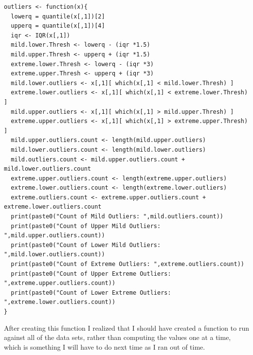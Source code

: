 \documentclass[10pt]{article}
\begin{document}
\begin{verbatim}
outliers <- function(x){
  lowerq = quantile(x[,1])[2]
  upperq = quantile(x[,1])[4]
  iqr <- IQR(x[,1])
  mild.lower.Thresh <- lowerq - (iqr *1.5)
  mild.upper.Thresh <- upperq + (iqr *1.5)
  extreme.lower.Thresh <- lowerq - (iqr *3)
  extreme.upper.Thresh <- upperq + (iqr *3)
  mild.lower.outliers <- x[,1][ which(x[,1] < mild.lower.Thresh) ]
  extreme.lower.outliers <- x[,1][ which(x[,1] < extreme.lower.Thresh) ]
  mild.upper.outliers <- x[,1][ which(x[,1] > mild.upper.Thresh) ]
  extreme.upper.outliers <- x[,1][ which(x[,1] > extreme.upper.Thresh) ]
  mild.upper.outliers.count <- length(mild.upper.outliers)
  mild.lower.outliers.count <- length(mild.lower.outliers)
  mild.outliers.count <- mild.upper.outliers.count + mild.lower.outliers.count
  extreme.upper.outliers.count <- length(extreme.upper.outliers)
  extreme.lower.outliers.count <- length(extreme.lower.outliers)
  extreme.outliers.count <- extreme.upper.outliers.count + extreme.lower.outliers.count 
  print(paste0("Count of Mild Outliers: ",mild.outliers.count))
  print(paste0("Count of Upper Mild Outliers: ",mild.upper.outliers.count))
  print(paste0("Count of Lower Mild Outliers: ",mild.lower.outliers.count))
  print(paste0("Count of Extreme Outliers: ",extreme.outliers.count))
  print(paste0("Count of Upper Extreme Outliers: ",extreme.upper.outliers.count))
  print(paste0("Count of Lower Extreme Outliers: ",extreme.lower.outliers.count))
}
\end{verbatim}
After creating this function I realized that I should have created a function to run against all of the data sets, rather than computing the values one at a time, which is something I will have to do next time as I ran out of time. 
\end{document}

